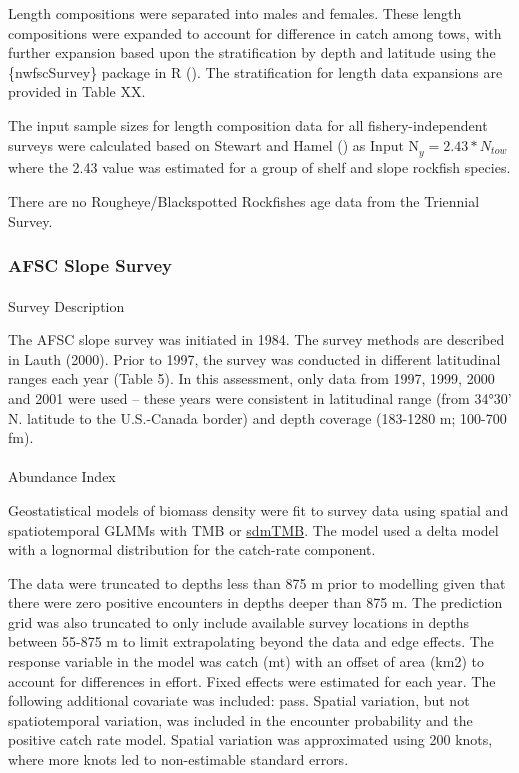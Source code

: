 \documentclass[
]{scrartcl}
\makeatletter
\let\oldparagraph\paragraph
\renewcommand{\paragraph}{
    \@ifstar
      \xxxParagraphStar
      \xxxParagraphNoStar
  }
\newcommand{\xxxParagraphStar}[1]{\oldparagraph*{#1}\mbox{}}
\newcommand{\xxxParagraphNoStar}[1]{\oldparagraph{#1}\mbox{}}
\makeatother
\begin{document}
Length compositions were separated into males and females. These length
compositions were expanded to account for difference in catch among
tows, with further expansion based upon the stratification by depth and
latitude using the \{nwfscSurvey\} package in R
().
The stratification for length data expansions are provided in Table XX.

The input sample sizes for length composition data for all
fishery-independent surveys were calculated based on Stewart and Hamel
() as
\(\text{Input N}_{y} = 2.43*N_{tow}\) where the 2.43 value was estimated
for a group of shelf and slope rockfish species.

There are no Rougheye/Blackspotted Rockfishes age data from the
Triennial Survey.

\subsubsection{AFSC Slope Survey}\label{afsc-slope-survey}

\paragraph{Survey Description}\label{survey-description-1}

The AFSC slope survey was initiated in 1984. The survey methods are
described in Lauth (2000). Prior to 1997, the survey was conducted in
different latitudinal ranges each year (Table 5). In this assessment,
only data from 1997, 1999, 2000 and 2001 were used -- these years were
consistent in latitudinal range (from 34°30' N. latitude to the
U.S.-Canada border) and depth coverage (183-1280 m; 100-700 fm).

\paragraph{Abundance Index}\label{abundance-index-1}

Geostatistical models of biomass density were fit to survey data using
spatial and spatiotemporal GLMMs with TMB or
\href{https://pbs-assess.github.io/sdmTMB/}{sdmTMB}. The model used a
delta model with a lognormal distribution for the catch-rate component.

The data were truncated to depths less than 875 m prior to modelling
given that there were zero positive encounters in depths deeper than 875
m. The prediction grid was also truncated to only include available
survey locations in depths between 55-875 m to limit extrapolating
beyond the data and edge effects. The response variable in the model was
catch (mt) with an offset of area (km2) to account for differences in
effort. Fixed effects were estimated for each year. The following
additional covariate was included: pass. Spatial variation, but not
spatiotemporal variation, was included in the encounter probability and
the positive catch rate model. Spatial variation was approximated using
200 knots, where more knots led to non-estimable standard errors.
\end{document}
